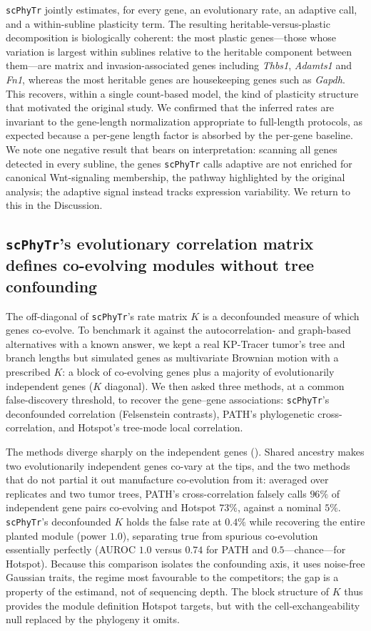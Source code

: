 \documentclass{article}
\newcommand{\scphytr}{\texttt{scPhyTr}}
\begin{document}
\scphytr{} jointly estimates, for every gene, an evolutionary rate, an adaptive call, and a
within-subline plasticity term. The resulting heritable-versus-plastic decomposition is
biologically coherent: the most plastic genes---those whose variation is largest within
sublines relative to the heritable component between them---are matrix and
invasion-associated genes including \emph{Thbs1}, \emph{Adamts1} and \emph{Fn1}, whereas
the most heritable genes are housekeeping genes such as \emph{Gapdh}. This recovers, within
a single count-based model, the kind of plasticity structure that motivated the original
study. We confirmed that the inferred rates are invariant to the gene-length normalization
appropriate to full-length protocols, as expected because a per-gene length factor is
absorbed by the per-gene baseline. We note one negative result that bears on
interpretation: scanning all genes detected in every subline, the genes \scphytr{} calls
adaptive are not enriched for canonical Wnt-signaling membership, the pathway highlighted
by the original analysis; the adaptive signal instead tracks expression variability. We
return to this in the Discussion.

\subsection*{\scphytr{}'s evolutionary correlation matrix defines co-evolving modules without tree confounding}

The off-diagonal of \scphytr{}'s rate matrix $K$ is a deconfounded measure of which genes
co-evolve. To benchmark it against the autocorrelation- and graph-based alternatives with a
known answer, we kept a real KP-Tracer tumor's tree and branch lengths but simulated genes
as multivariate Brownian motion with a prescribed $K$: a block of co-evolving genes plus a
majority of evolutionarily independent genes ($K$ diagonal). We then asked three methods,
at a common false-discovery threshold, to recover the gene--gene associations: \scphytr{}'s
deconfounded correlation (Felsenstein contrasts), PATH's phylogenetic cross-correlation, and
Hotspot's tree-mode local correlation.

The methods diverge sharply on the independent genes (). Shared ancestry
makes two evolutionarily independent genes co-vary at the tips, and the two methods that do
not partial it out manufacture co-evolution from it: averaged over replicates and two tumor
trees, PATH's cross-correlation falsely calls $96\%$ of independent gene pairs co-evolving
and Hotspot $73\%$, against a nominal $5\%$. \scphytr{}'s deconfounded $K$ holds the false
rate at $0.4\%$ while recovering the entire planted module (power $1.0$), separating true
from spurious co-evolution essentially perfectly (AUROC $1.0$ versus $0.74$ for PATH and
$0.5$---chance---for Hotspot). Because this comparison isolates the confounding axis, it uses
noise-free Gaussian traits, the regime most favourable to the competitors; the gap is a
property of the estimand, not of sequencing depth. The block structure of $K$ thus provides
the module definition Hotspot targets, but with the cell-exchangeability null replaced by the
phylogeny it omits.
\end{document}
